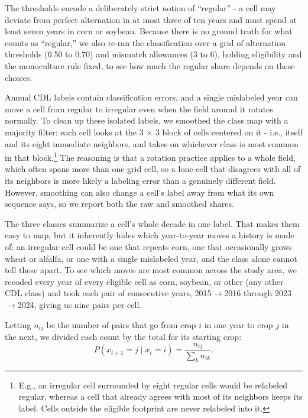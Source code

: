 \documentclass[10pt,letterpaper]{article}
\begin{document}
The thresholds encode a deliberately strict notion of ``regular'' - a cell may deviate from perfect alternation in at most three of ten years and must spend at least seven years in corn or soybean. Because there is no ground truth for what counts as ``regular,'' we also re-ran the classification over a grid of alternation thresholds (0.50 to 0.70) and mismatch allowances (3 to 6), holding eligibility and the monoculture rule fixed, to see how much the regular share depends on these choices.

Annual CDL labels contain classification errors, and a single mislabeled year can move a cell from regular to irregular even when the field around it rotates normally. To clean up these isolated labels, we smoothed the class map with a majority filter: each cell looks at the 3 $\times$ 3 block of cells centered on it - i.e., itself and its eight immediate neighbors, and takes on whichever class is most common in that block.\footnote{E.g., an irregular cell surrounded by eight regular cells would be relabeled regular, whereas a cell that already agrees with most of its neighbors keeps its label. Cells outside the eligible footprint are never relabeled into it.} The reasoning is that a rotation practice applies to a whole field, which often spans more than one grid cell, so a lone cell that disagrees with all of its neighbors is more likely a labeling error than a genuinely different field. However, smoothing can also change a cell's label away from what its own sequence says, so we report both the raw and smoothed shares.

The three classes summarize a cell's whole decade in one label. That makes them easy to map, but it inherently hides which year-to-year moves a history is made of: an irregular cell could be one that repeats corn, one that occasionally grows wheat or alfalfa, or one with a single mislabeled year, and the class alone cannot tell these apart. To see which moves are most common across the study area, we recoded every year of every eligible cell as corn, soybean, or other (any other CDL class) and took each pair of consecutive years, 2015$\to$2016 through 2023$\to$2024, giving us nine pairs per cell.

Letting $n_{ij}$ be the number of pairs that go from crop $i$ in one year to crop $j$ in the next, we divided each count by the total for its starting crop:
\begin{equation}
P(x_{t+1}=j\mid x_t=i)=\frac{n_{ij}}{\sum_k n_{ik}}.
\label{eq:markov}
\end{equation}
\end{document}
